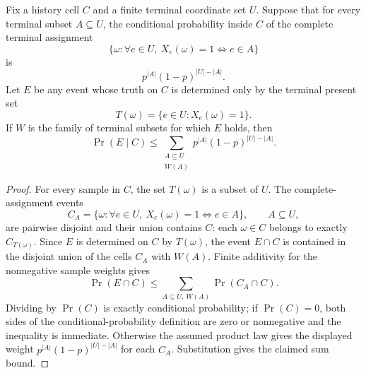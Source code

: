 \begin{helper}
Fix a history cell \(C\) and a finite terminal coordinate set \(U\).  Suppose
that for every terminal subset \(A\subseteq U\), the conditional probability
inside \(C\) of the complete terminal assignment
\[
\{\omega:\forall e\in U,\ X_e(\omega)=1 \Longleftrightarrow e\in A\}
\]
is
\[
p^{|A|}(1-p)^{|U|-|A|}.
\]
Let \(E\) be any event whose truth on \(C\) is determined only by the terminal
present set
\[
T(\omega)=\{e\in U:X_e(\omega)=1\}.
\]
If \(W\) is the family of terminal subsets for which \(E\) holds, then
\[
\Pr(E\mid C)
\le
\sum_{\substack{A\subseteq U\\ W(A)}}
p^{|A|}(1-p)^{|U|-|A|}.
\]
\end{helper}
\begin{proof}
For every sample in \(C\), the set \(T(\omega)\) is a subset of \(U\).  The
complete-assignment events
\[
C_A=\{\omega:\forall e\in U,\ X_e(\omega)=1 \Longleftrightarrow e\in A\},
\qquad A\subseteq U,
\]
are pairwise disjoint and their union contains \(C\): each \(\omega\in C\)
belongs to exactly \(C_{T(\omega)}\).  Since \(E\) is determined on \(C\) by
\(T(\omega)\), the event \(E\cap C\) is contained in the disjoint union of
the cells \(C_A\) with \(W(A)\).  Finite additivity for the nonnegative
sample weights gives
\[
\Pr(E\cap C)\le \sum_{A\subseteq U,\ W(A)}\Pr(C_A\cap C).
\]
Dividing by \(\Pr(C)\) is exactly conditional probability; if
\(\Pr(C)=0\), both sides of the conditional-probability definition are
zero or nonnegative and the inequality is immediate.  Otherwise the assumed
product law gives the displayed weight
\(p^{|A|}(1-p)^{|U|-|A|}\) for each \(C_A\).  Substitution gives the claimed
sum bound.
\end{proof}
